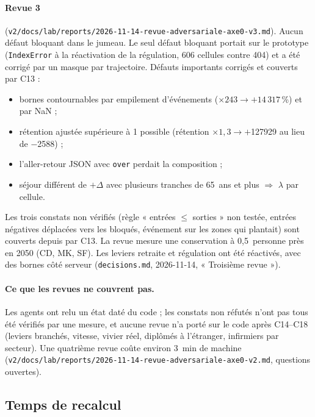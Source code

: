 \paragraph{Revue 3} (\texttt{v2/docs/lab/reports/2026-11-14-revue-adversariale-axe0-v3.md}). Aucun défaut bloquant
dans le jumeau. Le seul défaut bloquant portait sur le prototype (\texttt{IndexError} à la réactivation de la
régulation, 606 cellules contre 404) et a été corrigé par un masque par trajectoire. Défauts importants corrigés et
couverts par C13 :
\begin{itemize}
  \item bornes contournables par empilement d'événements ($\times 243 \to +14\,317$\mesure{}\,\%) et par NaN ;
  \item rétention ajustée supérieure à 1 possible (rétention $\times 1{,}3 \to +$\num{127929}\mesure{} au lieu de
        \num{-2588}) ;
  \item l'aller-retour JSON avec \texttt{over} perdait la composition ;
  \item séjour différent de $+\Delta$ avec plusieurs tranches de 65~ans et plus $\Rightarrow$ $\lambda$ par cellule.
\end{itemize}
Les trois constats non vérifiés (règle « entrées $\le$ sorties » non testée, entrées négatives déplacées vers les
bloqués, événement sur les zones qui plantait) sont couverts depuis par C13. La revue mesure une conservation à
0,5\mesure{}~personne près en 2050 (CD, MK, SF). Les leviers retraite et régulation ont été réactivés, avec des
bornes côté serveur (\texttt{decisions.md}, 2026-11-14, « Troisième revue »).

\paragraph{Ce que les revues ne couvrent pas.} Les agents ont relu un état daté du code ; les constats non
réfutés n'ont pas tous été vérifiés par une mesure, et aucune revue n'a porté sur le code après C14--C18
(leviers branchés, vitesse, vivier réel, diplômés à l'étranger, infirmiers par secteur). Une quatrième revue coûte
environ 3\suppose{}~min de machine (\texttt{v2/docs/lab/reports/2026-11-14-revue-adversariale-axe0-v2.md}, questions
ouvertes).

\subsection{Temps de recalcul}\label{jum:temps}

